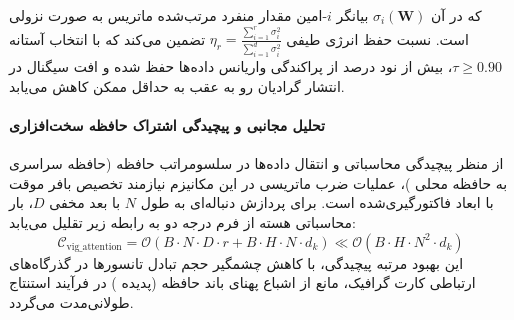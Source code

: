 که در آن $\sigma_i(\mathbf{W})$ بیانگر $i$-امین مقدار منفرد مرتب‌شده ماتریس به صورت نزولی است. نسبت حفظ انرژی طیفی $\eta_r = \frac{\sum_{i=1}^r \sigma_i^2}{\sum_{i=1}^{d} \sigma_i^2}$ تضمین می‌کند که با انتخاب آستانه $\tau \ge 0.90$، بیش از نود درصد از پراکندگی واریانس داده‌ها حفظ شده و افت سیگنال در انتشار گرادیان رو به عقب به حداقل ممکن کاهش می‌یابد.

\paragraph{تحلیل مجانبی و پیچیدگی اشتراک حافظه سخت‌افزاری}
از منظر پیچیدگی محاسباتی و انتقال داده‌ها در سلسومراتب حافظه (حافظه سراسری  به حافظه محلی )، عملیات ضرب ماتریسی در این مکانیزم نیازمند تخصیص بافر موقت با ابعاد فاکتورگیری‌شده است. برای پردازش دنباله‌ای به طول $N$ با بعد مخفی $D$، بار محاسباتی هسته از فرم درجه دو به رابطه زیر تقلیل می‌یابد:
\begin{equation}
\label{eq:complexity_vig_attention}
\mathcal{C}_{\text{vig\_attention}} = \mathcal{O}\left( B \cdot N \cdot D \cdot r + B \cdot H \cdot N \cdot d_k \right) \ll \mathcal{O}\left( B \cdot H \cdot N^2 \cdot d_k \right)
\end{equation}
این بهبود مرتبه پیچیدگی، با کاهش چشمگیر حجم تبادل تانسورها در گذرگاه‌های ارتباطی کارت گرافیک، مانع از اشباع پهنای باند حافظه (پدیده ) در فرآیند استنتاج طولانی‌مدت می‌گردد.
